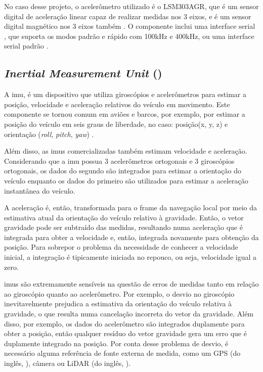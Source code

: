 \documentclass[acronym, symbols, table]{fei}
\begin{document}
				No caso desse projeto, o acelerômetro utilizado é o LSM303AGR, que é um sensor digital de aceleração linear capaz de realizar medidas nos 3 eixos, e é um sensor digital magnético nos 3 eixos também \cite{datasheet_accel}. O componente inclui uma interface serial , que suporta os modos padrão e rápido com 100kHz e 400kHz, ou uma interface serial padrão .
				
			\subsection{\textit{Inertial Measurement Unit} ()}
			
				A \acrshort{imu}, é um dispositivo que utiliza giroscópios e acelerômetros para estimar a posição, velocidade e aceleração relativos do veículo em movimento. Este componente se tornou comum em aviões e barcos, por exemplo, por estimar a posição do veículo em seis graus de liberdade, no caso: posição(x, y, z) e orientação (\textit{roll}, \textit{pitch}, \textit{yaw}) \cite{siegwart2011introduction}.
				
				Além disso, as \acrshort{imu}s comercializadas também estimam velocidade e aceleração. Considerando que a \acrshort{imu} possua 3 acelerômetros ortogonais e 3 giroscópios ortogonais, os dados do segundo são integrados para estimar a orientação do veículo enquanto os dados do primeiro são utilizados para estimar a aceleração instantânea do veículo.
				
				A aceleração é, então, transformada para o frame da navegação local por meio da estimativa atual da orientação do veículo relativo à gravidade. Então, o vetor gravidade pode ser subtraído das medidas, resultando numa aceleração que é integrada para obter a velocidade e, então, integrada novamente para obtenção da posição. Para sobrepor o problema da necessidade de conhecer a velocidade inicial, a integração é tipicamente iniciada no repouco, ou seja, velocidade igual a zero.
				
				\acrshort{imu}s são extremamente sensíveis na questão de erros de medidas tanto em relação ao giroscópio quanto ao acelerômetro. Por exemplo, o desvio no giroscópio inevitavelmente prejudica a estimativa da orientação do veículo relativa à gravidade, o que resulta numa cancelação incorreta do vetor da gravidade. Além disso, por exemplo, os dados do acelerômetro são integrados duplamente para obter a posição, então qualquer resíduo do vetor gravidade gera um erro que é duplamente integrado na posição. Por conta desse problema de desvio, é necessário alguma referência de fonte externa de medida, como um GPS (do inglês, ), câmera ou LiDAR (do inglês, ).
		
\end{document}
